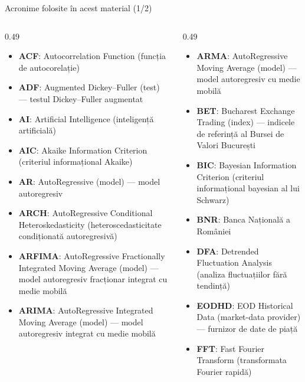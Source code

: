 {
\begin{frame}[noframenumbering]
    \titlepage
\end{frame}
}
\begin{frame}{Acronime folosite în acest material (1/2)}
\begin{columns}[T]
\begin{column}{0.49\textwidth}
\begin{itemize}\setlength{\itemsep}{0pt}
    \item \textbf{ACF}: Autocorrelation Function (funcția de autocorelație)
    \item \textbf{ADF}: Augmented Dickey–Fuller (test) — testul Dickey–Fuller augmentat
    \item \textbf{AI}: Artificial Intelligence (inteligență artificială)
    \item \textbf{AIC}: Akaike Information Criterion (criteriul informațional Akaike)
    \item \textbf{AR}: AutoRegressive (model) — model autoregresiv
    \item \textbf{ARCH}: AutoRegressive Conditional Heteroskedasticity (heteroscedasticitate condiționată autoregresivă)
    \item \textbf{ARFIMA}: AutoRegressive Fractionally Integrated Moving Average (model) — model autoregresiv fracționar integrat cu medie mobilă
    \item \textbf{ARIMA}: AutoRegressive Integrated Moving Average (model) — model autoregresiv integrat cu medie mobilă
\end{itemize}
\end{column}
\begin{column}{0.49\textwidth}
\begin{itemize}\setlength{\itemsep}{0pt}
    \item \textbf{ARMA}: AutoRegressive Moving Average (model) — model autoregresiv cu medie mobilă
    \item \textbf{BET}: Bucharest Exchange Trading (index) — indicele de referință al Bursei de Valori București
    \item \textbf{BIC}: Bayesian Information Criterion (criteriul informațional bayesian al lui Schwarz)
    \item \textbf{BNR}: Banca Națională a României
    \item \textbf{DFA}: Detrended Fluctuation Analysis (analiza fluctuațiilor fără tendință)
    \item \textbf{EODHD}: EOD Historical Data (market-data provider) — furnizor de date de piață
    \item \textbf{FFT}: Fast Fourier Transform (transformata Fourier rapidă)
\end{itemize}
\end{column}
\end{columns}
\end{frame}
